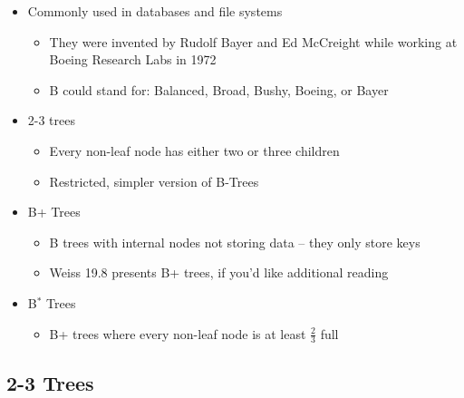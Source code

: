 \documentclass[
  10pt,
  english,
  letterpaper,
,tablecaptionabove
]{scrartcl}
\providecommand{\tightlist}{%
  \setlength{\itemsep}{0pt}\setlength{\parskip}{0pt}}
\begin{document}
\begin{itemize}
\tightlist
\item
  Commonly used in databases and file systems

  \begin{itemize}
  \tightlist
  \item
    They were invented by Rudolf Bayer and Ed McCreight while working at
    Boeing Research Labs in 1972
  \item
    B could stand for: Balanced, Broad, Bushy, Boeing, or Bayer
  \end{itemize}
\item
  2-3 trees

  \begin{itemize}
  \tightlist
  \item
    Every non-leaf node has either two or three children
  \item
    Restricted, simpler version of B-Trees
  \end{itemize}
\item
  B+ Trees

  \begin{itemize}
  \tightlist
  \item
    B trees with internal nodes not storing data -- they only store keys
  \item
    Weiss 19.8 presents B+ trees, if you'd like additional reading
  \end{itemize}
\item
  B\(^*\) Trees

  \begin{itemize}
  \tightlist
  \item
    B+ trees where every non-leaf node is at least \(\frac{2}{3}\) full
  \end{itemize}
\end{itemize}

\hypertarget{trees}{%
\subsection{2-3 Trees}\label{trees}}
\end{document}
